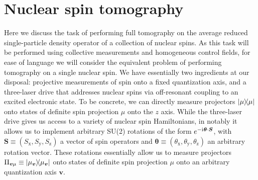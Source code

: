 \documentclass[nofootinbib,notitlepage,11pt]{revtex4-2}
\newcommand{\p}[1]{\left(#1\right)} %
\renewcommand{\v}{\bm} %
\renewcommand{\c}{\cdot} %
\renewcommand{\i}{\mathrm{i}\mkern1mu} %
\newcommand{\1}{\mathds{1}}
\newcommand{\x}{\text{x}}
\newcommand{\y}{\text{y}}
\newcommand{\z}{\text{z}}
\begin{document}
\newpage
\section{Nuclear spin tomography}

Here we discuss the task of performing full tomography on the average reduced single-particle density operator of a collection of nuclear spins.
As this task will be performed using collective measurements and homogeneous control fields, for ease of language we will consider the equivalent problem of performing tomography on a single nuclear spin.
We have essentially two ingredients at our disposal: projective measurements of spin onto a fixed quantization axis, and a three-laser drive that addresses nuclear spins via off-resonant coupling to an excited electronic state.
To be concrete, we can directly measure projectors $\op{\mu}$ onto states of definite spin projection $\mu$ onto the $z$ axis.
While the three-laser drive gives us access to a variety of nuclear spin Hamiltonians, in notably it allows us to implement arbitrary SU(2) rotations of the form $e^{-\i\v\theta\c\v S}$, with $\v S\equiv\p{S_\x,S_\y,S_\z}$ a vector of spin operators and $\v\theta\equiv\p{\theta_\x,\theta_\y,\theta_\z}$ an arbitrary rotation vector.
These rotations essentially allow us to measure projectors $\Pi_{\v v\mu} \equiv \op{\mu_{\v v}}$ onto states of definite spin projection $\mu$ onto an arbitrary quantization axis $\v v$.
\end{document}
